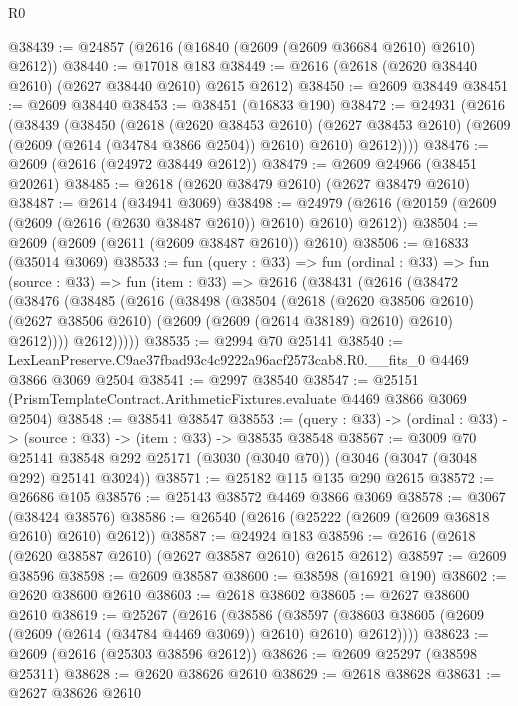 \begin{lexlean}{R0}
\begin{coremodule}
@38439 := @24857 (@2616 (@16840 (@2609 (@2609 @36684 @2610) @2610) @2612))
@38440 := @17018 @183
@38449 := @2616 (@2618 (@2620 @38440 @2610) (@2627 @38440 @2610) @2615 @2612)
@38450 := @2609 @38449
@38451 := @2609 @38440
@38453 := @38451 (@16833 @190)
@38472 := @24931
    (@2616
      (@38439
        (@38450
          (@2618
            (@2620 @38453 @2610)
            (@2627 @38453 @2610)
            (@2609 (@2609 (@2614 (@34784 @3866 @2504)) @2610) @2610)
            @2612))))
@38476 := @2609 (@2616 (@24972 @38449 @2612))
@38479 := @2609 @24966 (@38451 @20261)
@38485 := @2618 (@2620 @38479 @2610) (@2627 @38479 @2610)
@38487 := @2614 (@34941 @3069)
@38498 := @24979 (@2616 (@20159 (@2609 (@2609 (@2616 (@2630 @38487 @2610)) @2610) @2610) @2612))
@38504 := @2609 (@2609 (@2611 (@2609 @38487 @2610)) @2610)
@38506 := @16833 (@35014 @3069)
@38533 := fun (query : @33) =>
  fun (ordinal : @33) =>
  fun (source : @33) =>
  fun (item : @33) =>
  @2616
    (@38431
      (@2616
        (@38472
          (@38476
            (@38485
              (@2616
                (@38498
                  (@38504
                    (@2618
                      (@2620 @38506 @2610)
                      (@2627 @38506 @2610)
                      (@2609 (@2609 (@2614 @38189) @2610) @2610)
                      @2612))))
              @2612)))))
@38535 := @2994 @70 @25141
@38540 := LexLeanPreserve.C9ae37fbad93c4c9222a96acf2573cab8.R0.__fits_0 @4469 @3866 @3069 @2504
@38541 := @2997 @38540
@38547 := @25151 (PrismTemplateContract.ArithmeticFixtures.evaluate @4469 @3866 @3069 @2504)
@38548 := @38541 @38547
@38553 := (query : @33) -> (ordinal : @33) -> (source : @33) -> (item : @33) -> @38535 @38548
@38567 := @3009
    @70
    @25141
    @38548
    @292
    @25171
    (@3030 (@3040 @70))
    (@3046 (@3047 (@3048 @292) @25141 @3024))
@38571 := @25182 @115 @135 @290 @2615
@38572 := @26686 @105
@38576 := @25143 @38572 @4469 @3866 @3069
@38578 := @3067 (@38424 @38576)
@38586 := @26540 (@2616 (@25222 (@2609 (@2609 @36818 @2610) @2610) @2612))
@38587 := @24924 @183
@38596 := @2616 (@2618 (@2620 @38587 @2610) (@2627 @38587 @2610) @2615 @2612)
@38597 := @2609 @38596
@38598 := @2609 @38587
@38600 := @38598 (@16921 @190)
@38602 := @2620 @38600 @2610
@38603 := @2618 @38602
@38605 := @2627 @38600 @2610
@38619 := @25267
    (@2616
      (@38586
        (@38597 (@38603 @38605 (@2609 (@2609 (@2614 (@34784 @4469 @3069)) @2610) @2610) @2612))))
@38623 := @2609 (@2616 (@25303 @38596 @2612))
@38626 := @2609 @25297 (@38598 @25311)
@38628 := @2620 @38626 @2610
@38629 := @2618 @38628
@38631 := @2627 @38626 @2610

\end{coremodule}
\end{lexlean}
